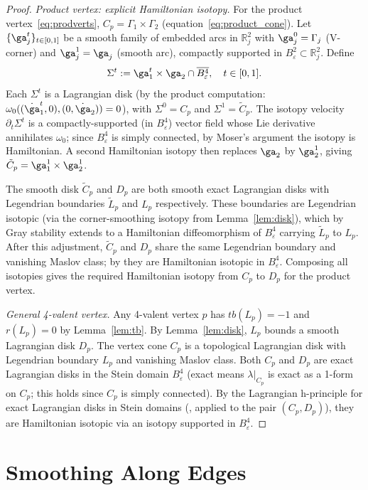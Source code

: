 \documentclass[12pt]{article}
\theoremstyle{definition}
\newcommand{\R}{\mathbb{R}}
\newcommand{\om}{\omega}
\newcommand{\eps}{\varepsilon}
\begin{document}
\begin{proof}
\emph{Product vertex: explicit Hamiltonian isotopy.}
For the product vertex~\eqref{eq:prodverts}, $C_p = \Gamma_1\times\Gamma_2$
(equation~\eqref{eq:product_cone}).  Let $\{\ga_j^t\}_{t\in[0,1]}$ be a
smooth family of embedded arcs in $\R^2_j$ with $\ga_j^0=\Gamma_j$
(V-corner) and $\ga_j^1=\ga_j$ (smooth arc), compactly supported in
$B^2_{\eps}\subset\R^2_j$.  Define
\[
  \Sigma^t := \ga_1^t\times\ga_2\cap\overline{B^4_\eps},\quad t\in[0,1].
\]
Each $\Sigma^t$ is a Lagrangian disk (by the product computation:
$\om_0((\dot\ga_1^t,0),(0,\dot\ga_2))=0$), with $\Sigma^0=C_p$ and
$\Sigma^1=\tilde{C}_p$.  The isotopy velocity $\partial_t\Sigma^t$ is
a compactly-supported (in $B^4_\eps$) vector field whose Lie derivative
annihilates $\om_0$; since $B^4_\eps$ is simply connected, by Moser's
argument the isotopy is Hamiltonian.  A second Hamiltonian isotopy then
replaces $\ga_2$ by $\ga_2^1$, giving $\tilde{C}_p=\ga_1^1\times\ga_2^1$.

The smooth disk $\tilde{C}_p$ and $D_p$ are both smooth exact Lagrangian
disks with Legendrian boundaries $\tilde{L}_p$ and $L_p$ respectively.
These boundaries are Legendrian isotopic (via the corner-smoothing isotopy
from Lemma~\ref{lem:disk}), which by Gray stability extends to a Hamiltonian
diffeomorphism of $B^4_\eps$ carrying $\tilde{L}_p$ to $L_p$.  After this
adjustment, $\tilde{C}_p$ and $D_p$ share the same Legendrian boundary and
vanishing Maslov class; by \cite[Proposition~16.7]{CE12} they are
Hamiltonian isotopic in $B^4_\eps$.  Composing all isotopies gives the
required Hamiltonian isotopy from $C_p$ to $D_p$ for the product vertex.

\emph{General 4-valent vertex.}
Any 4-valent vertex $p$ has $tb(L_p)=-1$ and $r(L_p)=0$ by Lemma~\ref{lem:tb}.
By Lemma~\ref{lem:disk}, $L_p$ bounds a smooth Lagrangian disk $D_p$.
The vertex cone $C_p$ is a topological Lagrangian disk with Legendrian
boundary $L_p$ and vanishing Maslov class.  Both $C_p$ and $D_p$ are exact
Lagrangian disks in the Stein domain $B^4_\eps$ (exact means $\lambda|_{C_p}$
is exact as a 1-form on $C_p$; this holds since $C_p$ is simply connected).
By the Lagrangian h-principle for exact Lagrangian disks in Stein domains
(\cite[Theorem~16.1]{CE12}, applied to the pair $(C_p, D_p)$), they are
Hamiltonian isotopic via an isotopy supported in $B^4_\eps$.
\end{proof}

\section{Smoothing Along Edges}\label{sec:edge}
\end{document}
